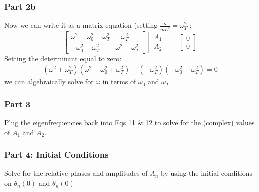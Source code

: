 \documentclass[pdf,handout, hideothersubsections]{beamer}
\begin{document}
\begingroup
\footnotesize
\begin{frame}
\frametitle{Part 2b}

Now we can write it as a matrix equation (setting $ \frac{\kappa}{m
  L^2} = \omega_T^2$ :
\[
\begin{bmatrix}
\omega^2 - \omega_0^2 + \omega_T^2 & -\omega_T^2 \\
-\omega_0^2 - \omega_T^2 & \omega^2 + \omega_T^2
\end{bmatrix}
\begin{bmatrix}
A_1 \\
A_2
\end{bmatrix}
=
\begin{bmatrix}
0 \\
0
\end{bmatrix}
\]
\pause
Setting the determinant equal to zero:
\begin{align}
(\omega^2 + \omega_T^2)(\omega^2 - \omega_0^2 + \omega_T^2) -
  (-\omega_T^2)(-\omega_0^2 - \omega_T^2) = 0
\end{align}
we can algebraically solve for $\omega$ in terms of $\omega_0$ and $\omega_T$.
\end{frame}
\endgroup

\begin{frame}
\frametitle{Part 3}
Plug the eigenfrequencies back into Eqs 11 \& 12 to solve for the
(complex) values of $A_1$ and $A_2$.

\end{frame}


\begin{frame}
\frametitle{Part 4: Initial Conditions}
Solve for the relative phases and amplitudes of $A_n$ by using the
initial conditions on $\theta_n(0)$ and $\dot{\theta_n}(0)$

\end{frame}








\end{document}
